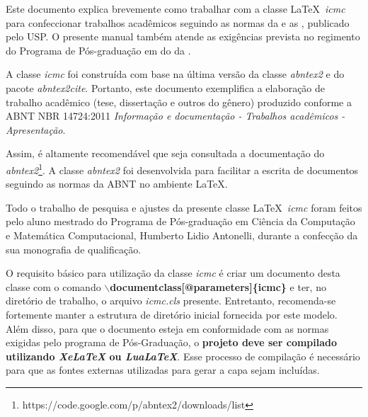 \newcommand{\comando}[1]{\textbf{$\backslash$#1}}

Este documento explica brevemente como trabalhar com a classe \LaTeX~\textit{icmc} para confeccionar trabalhos acadêmicos seguindo as normas da  e as , publicado pelo  USP. O presente manual também atende as exigências prevista no regimento do Programa de Pós-graduação em  do  da .


A classe \textit{icmc} foi construída com base na última versão da classe \textit{abntex2} e do pacote \textit{abntex2cite}. Portanto, este documento exemplifica a elaboração de trabalho
acadêmico (tese, dissertação e outros do gênero) produzido conforme a ABNT NBR
14724:2011 \textit{Informação e documentação - Trabalhos acadêmicos - Apresentação}.

Assim, é altamente recomendável que seja consultada a documentação do \textit{abntex2}\footnote{https://code.google.com/p/abntex2/downloads/list}. A classe \textit{abntex2} foi desenvolvida para facilitar a escrita de documentos seguindo as normas da ABNT no ambiente \LaTeX\;\cite{frasson:2005:classe_abnt}.

Todo o trabalho de pesquisa e ajustes da presente classe \LaTeX~\emph{icmc} foram feitos pelo aluno mestrado do Programa de Pós-graduação em Ciência da Computação e Matemática Computacional, Humberto Lidio Antonelli, durante a confecção da sua monografia de qualificação.

O requisito básico para utilização da classe \textit{icmc} é criar um documento desta classe com o comando
\comando{documentclass[@parameters]\{icmc\}} e ter, no diretório de trabalho, o arquivo \emph{icmc.cls} presente. Entretanto, recomenda-se fortemente manter a estrutura de diretório inicial fornecida por este modelo. Além disso, para que o documento esteja em conformidade com as normas exigidas pelo programa de Pós-Graduação, o \textbf{projeto deve ser compilado utilizando \textit{XeLaTeX} ou \textit{LuaLaTeX}}. Esse processo de compilação é necessário para que as fontes externas utilizadas para gerar a capa sejam incluídas.

